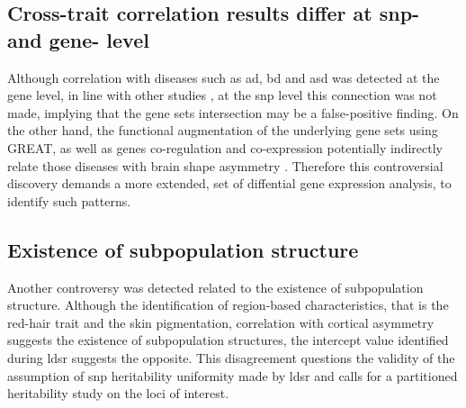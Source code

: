 \subsection{Cross-trait correlation results differ at \acs{snp}- and gene- level}
Although correlation with diseases such as \ac{ad}, \ac{bd} and \ac{asd} was detected at the gene level, in line with other studies \cite{Sha2021,Wang2018,Roe2021}, at the \ac{snp} level this connection was not made, implying that the gene sets intersection may be a false-positive finding. On the other hand, the functional augmentation of the underlying gene sets using GREAT, as well as genes co-regulation and co-expression potentially indirectly relate those diseases with brain shape asymmetry \cite{Siewert-Rocks2022}. Therefore this controversial discovery demands a more extended, set of diffential gene expression analysis, to identify such patterns.

\subsection{Existence of subpopulation structure}
Another controversy was detected related to the existence of subpopulation structure. Although the identification of region-based characteristics, that is the red-hair trait and the skin pigmentation, correlation with cortical asymmetry suggests the existence of subpopulation structures, the intercept value identified during \ac{ldsr} suggests the opposite. This disagreement questions the validity of the assumption of \ac{snp} heritability uniformity made by \ac{ldsr} and calls for a partitioned heritability study on the loci of interest.


